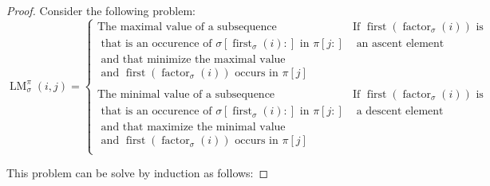 \documentclass[a4paper]{llncs}
\newcommand{\ptext}{\pi}
\newcommand{\pmotif}{\sigma}
\DeclareMathOperator{\firstia}{first}
\newcommand{\firsti}[2]{\firstia_{{#1}}({#2})}
\DeclareMathOperator{\factora}{factor}
\newcommand{\factor}[2]{\factora_{{#1}}({#2})}
\DeclareMathOperator{\firsta}{first}
\newcommand{\first}[2]{\firsta(\factor{#1}{#2})}
\DeclareMathOperator{\LMa}{LM}
\newcommand{\LM}[4]{\LMa_{{#1}}^{{#2}}(#3,#4)}
\begin{document}
\begin{proof}
Consider the following problem:
$$
\LM{\pmotif}{\ptext}{i}{j} =
\begin{cases}

	\text{The maximal value of a subsequence} 
		& \text{If $\first{\sigma}{i}$ is  } \\
	\text{ that is an occurence of $\sigma[\firsti{\sigma}{i}:]$ in $\pi[j:]$} & 
		\text{ an ascent element } \\	
	\text{ and that minimize the maximal value} & \\
	\text{ and $\first{\sigma}{i}$ occurs in $\ptext[j]$} & \\

	&\\

	
	\text{The minimal value of a subsequence} 
		& \text{If $\first{\sigma}{i}$ is  } \\
	\text{ that is an occurence of $\sigma[\firsti{\sigma}{i}:]$ in $\pi[j:]$} & \text{ a descent element } \\	
	\text{ and that maximize the minimal value} & \\
	\text{ and $\first{\sigma}{i}$ occurs in $\ptext[j]$} & \\
\end{cases}
$$

This problem can be solve by induction as follows:


\end{proof}
\end{document}
